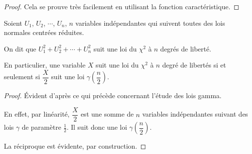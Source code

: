 \begin{proof}
Cela se prouve très facilement en utilisant la fonction caractéristique.
\end{proof}

\begin{de}
Soient $U_1$, $U_2$, $\cdots$, $U_n$, $n$ variables indépendantes qui suivent toutes des lois normales centrées réduites.

On dit que $U_1^2+U_2^2+ \cdots + U_n^2$ suit une loi du $\chi^2$ à $n$ degrés de liberté.

En particulier, une variable $X$ suit une loi du $\chi^2$ à $n$ degré de libertés si et seulement si $\dfrac{X}{2}$ suit une loi $\gamma\left(\dfrac{n}{2}\right)$.
\end{de}

\begin{proof}
Évident d'après ce qui précède concernant l'étude des lois gamma. 

En effet, par linéarité, $\dfrac{X}{2}$ est une somme de $n$ variables indépendantes suivant des lois $\gamma$ de paramètre $\frac{1}{2}$. Il suit donc une loi $\gamma\left(\dfrac{n}{2}\right)$.

La réciproque est évidente, par construction.
\end{proof}
%
%